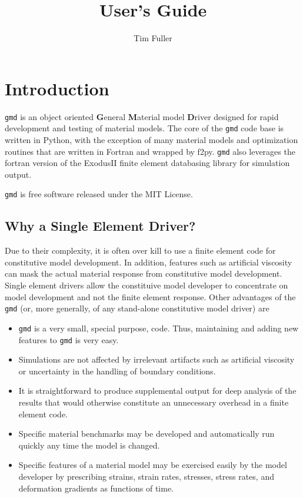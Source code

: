 \documentclass[11pt]{report}
\title{\gmd{} User's Guide}
\author{Tim Fuller}
\newcommand{\gmd}{\texttt{gmd}}
\begin{document}
\maketitle

\chapter{Introduction}
\gmd{} is an object oriented \textbf{G}eneral \textbf{M}aterial model
\textbf{D}river designed for rapid development and testing of material models.
The core of the \gmd{} code base is written in Python, with the exception of
many material models and optimization routines that are written in Fortran and
wrapped by f2py. \gmd{} also leverages the fortran version of the ExodusII
finite element databasing library for simulation output.

\gmd{} is free software released under the MIT License.


\section{Why a Single Element Driver?}
Due to their complexity, it is often over kill to use a finite element code
for constitutive model development. In addition, features such as artificial
viscosity can mask the actual material response from constitutive model
development. Single element drivers allow the constituive model developer to
concentrate on model development and not the finite element response. Other
advantages of the \gmd{} (or, more generally, of any stand-alone
constitutive model driver) are

\begin{itemize}
  \item \gmd{} is a very small, special purpose, code. Thus, maintaining and
  adding new features to \gmd{} is very easy.

  \item Simulations are not affected by irrelevant artifacts such as
  artificial viscosity or uncertainty in the handling of boundary conditions.

  \item It is straightforward to produce supplemental output for deep analysis
  of the results that would otherwise constitute an unnecessary overhead in a
  finite element code.

  \item Specific material benchmarks may be developed and automatically run
  quickly any time the model is changed.

  \item Specific features of a material model may be exercised easily by the
  model developer by prescribing strains, strain rates, stresses, stress
  rates, and deformation gradients as functions of time.
\end{itemize}
\end{document}
